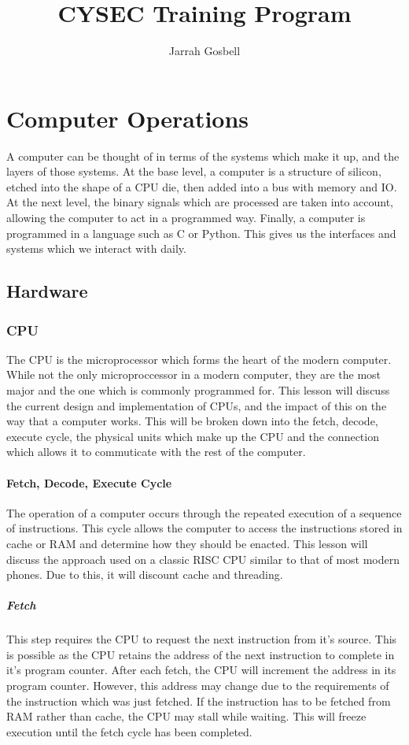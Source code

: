 \documentclass[a4paper,11pt]{report}
\author{Jarrah Gosbell}
\title{CYSEC Training Program}
\begin{document}
\maketitle
\tableofcontents
\newpage
\chapter{Computer Operations}
	A computer can be thought of in terms of the systems which make it up, and the layers of those systems.
	At the base level, a computer is a structure of silicon, etched into the shape of a CPU die, then added into a bus with memory and IO.
	At the next level, the binary signals which are processed are taken into account, allowing the computer to act in a programmed way. 
	Finally, a computer is programmed in a language such as C or Python. This gives us the interfaces and systems which we interact with daily. 
	\section{Hardware}
		\subsection{CPU} 
			The CPU is the microprocessor which forms the heart of the modern computer. 
			While not the only microproccessor in a modern computer, they are the most major and the one which is commonly programmed for. 
			This lesson will discuss the current design and implementation of CPUs, and the impact of this on the way that a computer works. 
			This will be broken down into the fetch, decode, execute cycle, the physical units which make up the CPU and the connection which allows it to commuticate with the rest of the computer. 
			\subsubsection{Fetch, Decode, Execute Cycle}
				The operation of a computer occurs through the repeated execution of a sequence of instructions.
				This cycle allows the computer to access the instructions stored in cache or RAM and determine how they should be enacted. This lesson will discuss the approach used on a classic RISC CPU similar to that of most modern phones. 
				Due to this, it will discount cache and threading. 
				\paragraph{Fetch}
					This step requires the CPU to request the next instruction from it's source. 
					This is possible as the CPU retains the address of the next instruction to complete in it's program counter. 
					After each fetch, the CPU will increment the address in its program counter. 
					However, this address may change due to the requirements of the instruction which was just fetched. 
					If the instruction has to be fetched from RAM rather than cache, the CPU may stall while waiting.
					This will freeze execution until the fetch cycle has been completed. 
\end{document}
